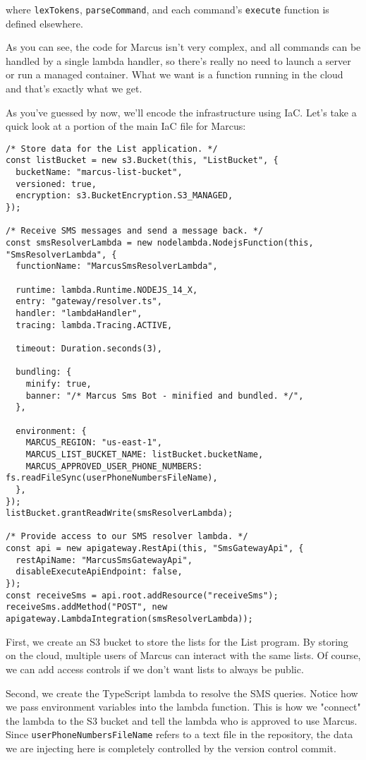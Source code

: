 \documentclass{article}
\begin{document}
where \texttt{lexTokens}, \texttt{parseCommand}, and each command's \texttt{execute} function is defined elsewhere.

As you can see, the code for Marcus isn't very complex, and all commands can be handled by a single lambda handler, so there's really no need to launch a server or run a managed container.
What we want is a function running in the cloud and that's exactly what we get.

As you've guessed by now, we'll encode the infrastructure using IaC.
Let's take a quick look at a portion of the main IaC file for Marcus:

\begin{verbatim}
/* Store data for the List application. */
const listBucket = new s3.Bucket(this, "ListBucket", {
  bucketName: "marcus-list-bucket",
  versioned: true,
  encryption: s3.BucketEncryption.S3_MANAGED,
});

/* Receive SMS messages and send a message back. */
const smsResolverLambda = new nodelambda.NodejsFunction(this, "SmsResolverLambda", {
  functionName: "MarcusSmsResolverLambda",

  runtime: lambda.Runtime.NODEJS_14_X,
  entry: "gateway/resolver.ts",
  handler: "lambdaHandler",
  tracing: lambda.Tracing.ACTIVE,

  timeout: Duration.seconds(3),

  bundling: {
    minify: true,
    banner: "/* Marcus Sms Bot - minified and bundled. */",
  },

  environment: {
    MARCUS_REGION: "us-east-1",
    MARCUS_LIST_BUCKET_NAME: listBucket.bucketName,
    MARCUS_APPROVED_USER_PHONE_NUMBERS: fs.readFileSync(userPhoneNumbersFileName),
  },
});
listBucket.grantReadWrite(smsResolverLambda);

/* Provide access to our SMS resolver lambda. */
const api = new apigateway.RestApi(this, "SmsGatewayApi", {
  restApiName: "MarcusSmsGatewayApi",
  disableExecuteApiEndpoint: false,
});
const receiveSms = api.root.addResource("receiveSms");
receiveSms.addMethod("POST", new apigateway.LambdaIntegration(smsResolverLambda));
\end{verbatim}

First, we create an S3 bucket to store the lists for the List program.
By storing on the cloud, multiple users of Marcus can interact with the same lists.
Of course, we can add access controls if we don't want lists to always be public.

Second, we create the TypeScript lambda to resolve the SMS queries.
Notice how we pass environment variables into the lambda function.
This is how we "connect" the lambda to the S3 bucket and tell the lambda who is approved to use Marcus.
Since \texttt{userPhoneNumbersFileName} refers to a text file in the repository, the data we are injecting here is completely controlled by the version control commit.
\end{document}
